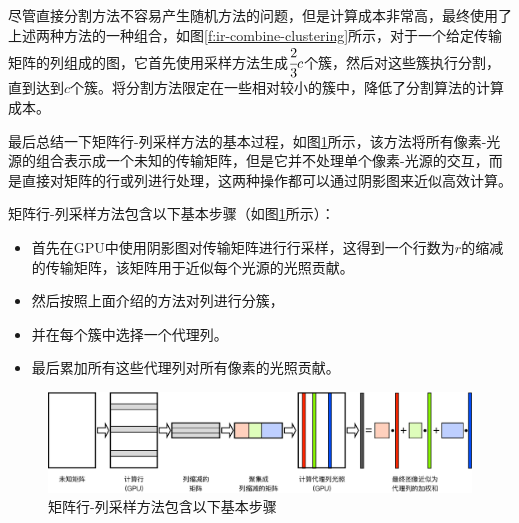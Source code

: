 尽管直接分割方法不容易产生随机方法的问题，但是计算成本非常高，\cite{a:MatrixRow-ColumnSamplingfortheMany-LightProblem}最终使用了上述两种方法的一种组合，如图\ref{f:ir-combine-clustering}所示，对于一个给定传输矩阵的列组成的图，它首先使用采样方法生成$ \cfrac{2}{3}c$个簇，然后对这些簇执行分割，直到达到$c$个簇。将分割方法限定在一些相对较小的簇中，降低了分割算法的计算成本。

最后总结一下矩阵行-列采样方法的基本过程，如图\ref{f:ir-matrix-row-column}所示，该方法将所有像素-光源的组合表示成一个未知的传输矩阵，但是它并不处理单个像素-光源的交互，而是直接对矩阵的行或列进行处理，这两种操作都可以通过阴影图来近似高效计算。

矩阵行-列采样方法包含以下基本步骤（如图\ref{f:ir-matrix-row-column}所示）：

\begin{itemize}
	\item 首先在GPU中使用阴影图对传输矩阵进行行采样，这得到一个行数为$r$的缩减的传输矩阵，该矩阵用于近似每个光源的光照贡献。
	\item 然后按照上面介绍的方法对列进行分簇，
	\item 并在每个簇中选择一个代理列。
	\item 最后累加所有这些代理列对所有像素的光照贡献。
\end{itemize}

\begin{figure}
\begin{fullwidth}
	\includegraphics[width=1.0\thewidth]{figures/ir/matrix-row-column}
	\caption{矩阵行-列采样方法包含以下基本步骤}
	\label{f:ir-matrix-row-column}
\end{fullwidth}
\end{figure}



